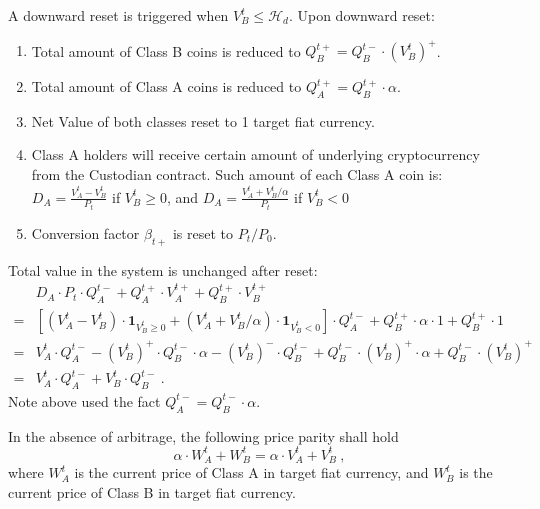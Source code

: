 \documentclass[11pt]{article}%
\numberwithin{equation}{section}
\theoremstyle{plain}
\begin{document}
\begin{appendices}
A downward reset is triggered when $V_{B}^{t}\leqslant\mathcal{H}_{d}$. Upon downward reset:
\begin{enumerate}
\item Total amount of Class B coins is reduced to $Q_{B}^{t+}=Q_{B}^{t-}\cdot (V_{B}^{t})^+$.
\item Total amount of Class A coins is reduced to $Q_{A}^{t+}=Q_{B}^{t+}\cdot\alpha$.
\item Net Value of both classes reset to 1 target fiat currency.
\item Class A holders will receive certain amount of underlying cryptocurrency from the Custodian contract. Such amount of each Class A coin is: $D_{A}=\frac{V_{A}^{t}-V_{B}^{t}}{P_{t}}$ if $V_B^t\ge 0$, and $D_{A}=\frac{V_{A}^{t}+V_{B}^{t}/\alpha}{P_{t}}$ if $V_B^t< 0$
\item Conversion factor $\beta_{t+}$ is reset to $P_t/P_0$.
\end{enumerate}
Total value in the system is unchanged after reset:
\begin{align*}
 & D_{A}\cdot P_{t}\cdot Q_{A}^{t-}+Q_{A}^{t+}\cdot V_{A}^{t+}+Q_{B}^{t+}\cdot V_{B}^{t+}\\
= & \left[\left(V_{A}^{t}-V_{B}^{t}\right)\cdot\mathbf{1}_{V_B^t\ge 0}+\left(V_{A}^{t}+V_{B}^{t}/\alpha\right)\cdot\mathbf{1}_{V_B^t< 0}\right]\cdot Q_{A}^{t-}+Q_{B}^{t+}\cdot\alpha\cdot1+Q_{B}^{t+}\cdot1\\
= & V_{A}^{t}\cdot Q_{A}^{t-}-(V_{B}^{t})^+\cdot Q_{B}^{t-}\cdot\alpha-(V_{B}^{t})^-\cdot Q_{B}^{t-}+Q_{B}^{t-}\cdot (V_{B}^{t})^+\cdot\alpha+Q_{B}^{t-}\cdot (V_{B}^{t})^+\\
= & V_{A}^{t}\cdot Q_{A}^{t-}+V_{B}^{t}\cdot Q_{B}^{t-}\ .
\end{align*}
Note above used the fact $Q_{A}^{t-}=Q_{B}^{t-}\cdot\alpha$.




In the absence of arbitrage, the following price parity shall hold
\[
\alpha\cdot W_{A}^{t}+W_{B}^{t}=\alpha\cdot V_{A}^{t}+V_{B}^{t}\ ,
\]
where $W_{A}^{t}$ is the current price of Class A in target fiat currency, and $W_{B}^{t}$ is the current price of Class B in target fiat currency.


\end{appendices}
\end{document}
